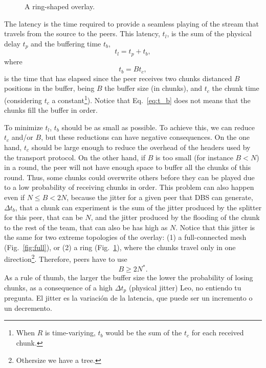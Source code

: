 

\label{sec:latency}

\begin{figure}
  \centering
  \vbox{}
  \caption{A ring-shaped overlay.}
  \label{fig:ring}
\end{figure}

The latency is the time required to provide a seamless playing of
the stream that travels from the source to the peers. This latency,
$t_l$, is the sum of the physical delay $t_p$ and the buffering time
$t_b$,
\begin{equation}
  \label{eq:t_l}
  t_l = t_p + t_b,
\end{equation}
where
\begin{equation}
  \label{eq:t_b}
  t_b = Bt_c,
\end{equation}
is the time that has elapsed since the peer receives two chunks
distanced $B$ positions in the buffer, being $B$ the buffer
size (in chunks), and $t_c$ the chunk time (considering $t_c$ a
constant\footnote{When $R$ is time-variying, $t_b$ would be the sum of
  the $t_c$ for each received chunk.}). Notice that Eq.~\ref{eq:t_b}
does not means that the chunks fill the buffer in order.

To minimize $t_l$, $t_b$ should be as small as possible. To achieve
this, we can reduce $t_c$ and/or $B$, but these reductions can have
negative consequences. On the one hand, $t_c$ should be large enough
to reduce the overhead of the headers used by the transport
protocol. On the other hand, if $B$ is too small (for instance $B<N$)
in a round, the peer will not have enough space to buffer all the
chunks of this round. Thus, some chunks could overwrite others before
they can be played due to a low probability of receiving chunks in
order. This problem can also happen even if $N\leq B<2N$, because the
jitter for a given peer that DBS can generate, $\Delta t_b$, that a
chunk can experiment is the sum of the jitter produced by the splitter
for this peer, that can be $N$, and the jitter produced by the
flooding of the chunk to the rest of the team, that can also be has
high as $N$. Notice that this jitter is the same for two extreme
topologies of the overlay: (1) a full-connected mesh
(Fig.~\ref{fig:full}), or (2) a ring (Fig.~\ref{fig:ring}), where the
chunks travel only in one direction\footnote{Othersize we have a
  tree.}. Therefore, peers have to use
\begin{equation}
  \label{eq:minimum_B}
  B\ge 2N^*.
\end{equation}
As a rule of thumb, the larger the buffer size the lower the
probability of losing chunks, as a consequence of a high $\Delta t_p$
(physical jitter)  {\color{red}
  Leo, no entiendo tu pregunta. El jitter es la variación de la
  latencia, que puede ser un incremento o un decremento}.

